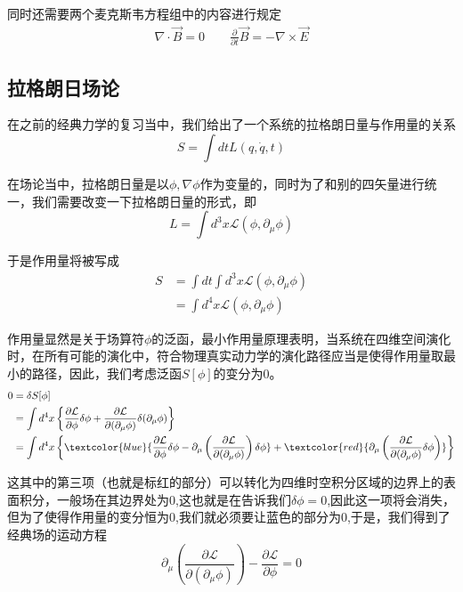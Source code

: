 \documentclass{article}
\begin{document}
同时还需要两个麦克斯韦方程组中的内容进行规定
\begin{align*}
    \nabla\cdot\vec{B}=0\quad\quad\frac{\partial}{\partial t}\vec{B}=-\nabla\times\vec{E}
\end{align*}




\subsection{拉格朗日场论}
在之前的经典力学的复习当中，我们给出了一个系统的拉格朗日量与作用量的关系
\[S=\int dt L(q,\dot{q},t)\]

在场论当中，拉格朗日量是以$\phi,\nabla\phi$作为变量的，同时为了和别的四矢量进行统一，我们需要改变一下拉格朗日量的形式，即
\begin{equation*}
    L=\int d^3x\mathcal{L}(\phi,\partial_\mu\phi)
\end{equation*}

于是作用量将被写成
\begin{align*}
    S&=\int dt\int d^3x\mathcal{L}(\phi,\partial_\mu\phi)\\
    &=\int d^4x \mathcal{L}(\phi,\partial_\mu\phi)
\end{align*}

作用量显然是关于场算符$\phi$的泛函，最小作用量原理表明，当系统在四维空间演化时，在所有可能的演化中，符合物理真实动力学的演化路径应当是使得作用量取最小的路径，因此，我们考虑泛函$S[\phi]$的变分为$0$。
\begin{align*}
    0&=\delta S[\phi]\\
    &=\int d^4x \left\{\frac{\partial\mathcal{L}}{\partial \phi}\delta\phi+\frac{\partial \mathcal{L}}{\partial(\partial_\mu \phi)}\delta(\partial_\mu \phi)\right\}\\
    &=\int d^4x \left\{\textcolor{blue}{\frac{\partial\mathcal{L}}{\partial \phi}\delta \phi-\partial_\mu\left(\frac{\partial \mathcal{L}}{\partial(\partial_\mu\phi)}\right)\delta \phi}+\textcolor{red}{\partial_{\mu}\left(\frac{\partial \mathcal{L}}{\partial(\partial_\mu\phi)}\delta\phi\right)}\right\}
\end{align*}

这其中的第三项（也就是标红的部分）可以转化为四维时空积分区域的边界上的表面积分，一般场在其边界处为$0$,这也就是在告诉我们$\delta \phi=0$,因此这一项将会消失，但为了使得作用量的变分恒为$0$,我们就必须要让蓝色的部分为$0$,于是，我们得到了经典场的运动方程
\begin{equation*}
    \partial_\mu\left(\frac{\partial \mathcal{L}}{\partial(\partial_\mu\phi)}\right)-\frac{\partial\mathcal{L}}{\partial \phi}=0
\end{equation*}
\end{document}
